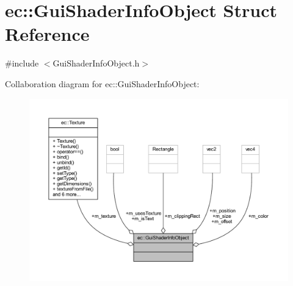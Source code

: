 \hypertarget{structec_1_1_gui_shader_info_object}{}\section{ec\+:\+:Gui\+Shader\+Info\+Object Struct Reference}
\label{structec_1_1_gui_shader_info_object}


{\ttfamily \#include $<$Gui\+Shader\+Info\+Object.\+h$>$}



Collaboration diagram for ec\+:\+:Gui\+Shader\+Info\+Object\+:
\nopagebreak
\begin{figure}[H]
\begin{center}
\leavevmode
\includegraphics[width=350pt]{structec_1_1_gui_shader_info_object__coll__graph}
\end{center}
\end{figure}
